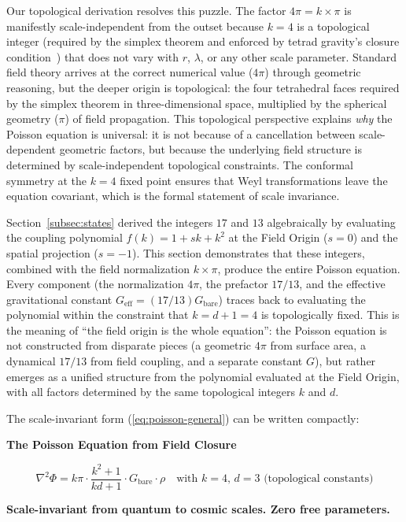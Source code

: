 \documentclass[aps,prd,preprint,superscriptaddress,showpacs,preprintnumbers,amsmath,amssymb,nofootinbib]{revtex4-2}
\begin{document}
Our topological derivation resolves this puzzle. The factor $4\pi = k\times\pi$ is manifestly scale-independent from the outset because $k=4$ is a topological integer (required by the simplex theorem and enforced by tetrad gravity's closure condition~\cite{mtw1973,wald1984}) that does not vary with $r$, $\lambda$, or any other scale parameter. Standard field theory arrives at the correct numerical value ($4\pi$) through geometric reasoning, but the deeper origin is topological: the four tetrahedral faces required by the simplex theorem in three-dimensional space, multiplied by the spherical geometry ($\pi$) of field propagation. This topological perspective explains \emph{why} the Poisson equation is universal: it is not because of a cancellation between scale-dependent geometric factors, but because the underlying field structure is determined by scale-independent topological constraints. The conformal symmetry at the $k=4$ fixed point ensures that Weyl transformations leave the equation covariant, which is the formal statement of scale invariance.

Section~\ref{subsec:states} derived the integers $17$ and $13$ algebraically by evaluating the coupling polynomial $f(k) = 1 + sk + k^2$ at the Field Origin ($s=0$) and the spatial projection ($s=-1$). This section demonstrates that these integers, combined with the field normalization $k\times\pi$, produce the entire Poisson equation. Every component (the normalization $4\pi$, the prefactor $17/13$, and the effective gravitational constant $G_{\text{eff}} = (17/13)G_{\text{bare}}$) traces back to evaluating the polynomial within the constraint that $k = d+1 = 4$ is topologically fixed. This is the meaning of ``the field origin is the whole equation'': the Poisson equation is not constructed from disparate pieces (a geometric $4\pi$ from surface area, a dynamical $17/13$ from field coupling, and a separate constant $G$), but rather emerges as a unified structure from the polynomial evaluated at the Field Origin, with all factors determined by the same topological integers $k$ and $d$.

The scale-invariant form (\ref{eq:poisson-general}) can be written compactly:

\vspace{1.5em}
\noindent
\colorbox{resultgreen}{\parbox{\dimexpr\textwidth-2\fboxsep\relax}{%
\vspace{0.8em}
\centering
\textbf{\large The Poisson Equation from Field Closure}

\vspace{0.5em}
\boldmath
\begin{equation}
\nabla^2\Phi = k\pi \cdot \frac{k^2+1}{kd+1} \cdot G_{\text{bare}} \cdot \rho
\quad \text{with } k=4, \, d=3 \text{ (topological constants)}
\label{eq:poisson-boxed}
\end{equation}
\unboldmath

\vspace{0.3em}
\textbf{Scale-invariant from quantum to cosmic scales. Zero free parameters.}
\vspace{0.5em}}}
\vspace{1.5em}
\end{document}
